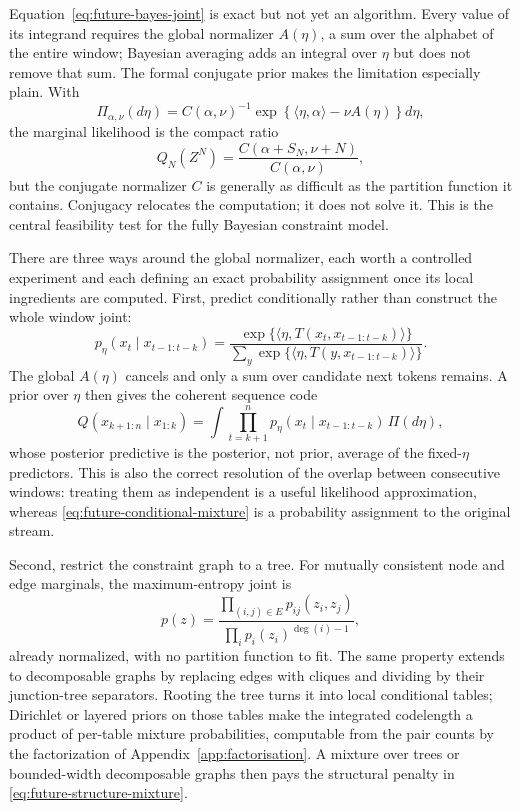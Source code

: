 \documentclass[11pt]{article}
\begin{document}
Equation~\eqref{eq:future-bayes-joint} is exact but not yet an
algorithm.  Every value of its integrand requires the global
normalizer $A(\eta)$, a sum over the alphabet of the entire window;
Bayesian averaging adds an integral over $\eta$ but does not remove
that sum.  The formal conjugate prior makes the limitation especially
plain.  With
\[
  \Pi_{\alpha,\nu}(d\eta)
  =C(\alpha,\nu)^{-1}
    \exp\!\left\{\langle\eta,\alpha\rangle-\nu A(\eta)\right\}d\eta,
\]
the marginal likelihood is the compact ratio
\begin{equation}
\label{eq:future-conjugate}
  Q_N(Z^N)
  =\frac{C(\alpha+S_N,\nu+N)}{C(\alpha,\nu)},
\end{equation}
but the conjugate normalizer $C$ is generally as difficult as the
partition function it contains.  Conjugacy relocates the computation;
it does not solve it.  This is the central feasibility test for the
fully Bayesian constraint model.

There are three ways around the global normalizer, each worth a
controlled experiment and each defining an exact probability assignment
once its local ingredients are computed.  First, predict conditionally
rather than construct the whole window joint:
\begin{equation}
\label{eq:future-conditional-family}
  p_\eta(x_t\mid x_{t-1:t-k})
  =\frac{\exp\{\langle\eta,T(x_t,x_{t-1:t-k})\rangle\}}
         {\sum_y\exp\{\langle\eta,T(y,x_{t-1:t-k})\rangle\}}.
\end{equation}
The global $A(\eta)$ cancels and only a sum over candidate next tokens
remains.  A prior over $\eta$ then gives the coherent sequence code
\begin{equation}
\label{eq:future-conditional-mixture}
  Q(x_{k+1:n}\mid x_{1:k})
  =\int\prod_{t=k+1}^{n}
       p_\eta(x_t\mid x_{t-1:t-k})\,\Pi(d\eta),
\end{equation}
whose posterior predictive is the posterior, not prior, average of
the fixed-$\eta$ predictors.  This is also the correct resolution of
the overlap between consecutive windows: treating them as independent
is a useful likelihood approximation, whereas
\eqref{eq:future-conditional-mixture} is a probability assignment to
the original stream.

Second, restrict the constraint graph to a tree.  For mutually
consistent node and edge marginals, the maximum-entropy joint is
\begin{equation}
\label{eq:future-tree-joint}
  p(z)=
  \frac{\prod_{(i,j)\in E}p_{ij}(z_i,z_j)}
       {\prod_i p_i(z_i)^{\deg(i)-1}},
\end{equation}
already normalized, with no partition function to fit.  The same
property extends to decomposable graphs by replacing edges with
cliques and dividing by their junction-tree separators.  Rooting the
tree turns it into local conditional tables; Dirichlet or layered
priors on those tables make the integrated codelength a product of
per-table mixture probabilities, computable from the pair counts by
the factorization of Appendix~\ref{app:factorisation}.  A mixture over
trees or bounded-width decomposable graphs then pays the structural
penalty in \eqref{eq:future-structure-mixture}.
\end{document}
